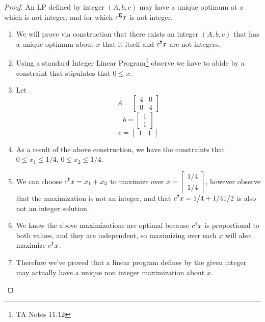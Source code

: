 \documentclass{article}
\begin{document}
\begin{proof} An LP defined by integer \((A, b, c)\) may have a unique optimum at \(x\) which
      is not integer, and for which \(c^{\Cross{}}x\) is not integer.
      \begin{enumerate}
            \item We will prove via construction that there exists an integer \((A, b,
            c)\) that has a unique optimum about \(x\) that it itself and
            \(c^{\text{\Cross{}}} x\) are not integers.
            \item Using a standard Integer Linear Program\footnote{TA Notes 11.12} observe
            we have to abide by a constraint that stipulates that \(0 \leq x\).
            \item Let \[A = \begin{bmatrix}
                  4 & 0 \\
                  0 & 4
            \end{bmatrix}\] 
            \[b = \begin{bmatrix}
                  1 \\ 1
            \end{bmatrix}\]
            \[c = \begin{bmatrix}
                  1 & 1
            \end{bmatrix}\]
            \item As a result of the above construction, we have the constraints that \( 0
            \leq x_1 \leq 1/4\), \(0 \leq x_2 \leq 1/4\).
            \item We can choose \(c^{\text{\Cross{}}} x = x_1 + x_2\) to maximize over \(x
            = \begin{bmatrix}
                  1/4 \\
                  1/4
            \end{bmatrix}\), however observe that the maximization is not an integer, and
            that \(c^{\text{\Cross{}}} x = 1/4 + 1/4 1/2\) is also not an integer
            solution. 
            \item We know the above maximizations are optimal because
            \(c^{\text{\Cross{}}} x\) is proportional to both values, and they are
            independent, so maximizing over each \(x\) will also maximize
            \(c^{\text{\Cross{}}} x\).
            \item Therefore we've proved that a linear program defines by the given
            integer may actually have a unique non integer maximization about \(x\). 
      \end{enumerate}

\end{proof}
\end{document}
